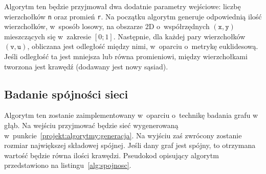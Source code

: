 			Algorytm ten będzie przyjmował dwa dodatnie parametry wejściowe: liczbę wierzchołków \texttt{n} oraz promień \texttt{r}. Na początku algorytm generuje odpowiednią ilość wierzchołków, w~sposób losowy, na obszarze 2D o~współrzędnych $(\texttt{x}, \texttt{y})$ mieszczących się w~zakresie $[0; 1]$. Następnie, dla każdej pary wierzchołków $(\texttt{v}, \texttt{u})$, obliczana jest odległość między nimi, w~oparciu o~metrykę euklidesową. Jeśli odległość ta jest mniejsza lub równa promieniowi, między wierzchołkami tworzona jest krawędź (dodawany jest nowy sąsiad).

		\subsection{Badanie spójności sieci}
			\label{projekt:algorytmy:spojnosc}

			Algorytm ten zostanie zaimplementowany w~oparciu o~technikę badania grafu w głąb\cite[s.~270]{WojciechowskiJacek2013Gis}. Na wejściu przyjmować będzie sieć wygenerowaną w~punkcie~\ref{projekt:algorytmy:generacja}. Na wyjściu zaś zwrócony zostanie rozmiar największej składowej spójnej. Jeśli dany graf jest spójny, to otrzymana wartość będzie równa ilości krawędzi. Pseudokod opisujący algorytm przedstawiono na listingu~\ref{alg:spojnosc}.

